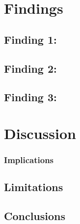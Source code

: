 \section{Findings}
\subsection{Finding 1:}
\subsection{Finding 2:}
\subsection{Finding 3:}

\section{Discussion}
\subsubsection{Implications}
\subsection{Limitations}
\subsection{Conclusions}

\clearpage
\printbibliography

